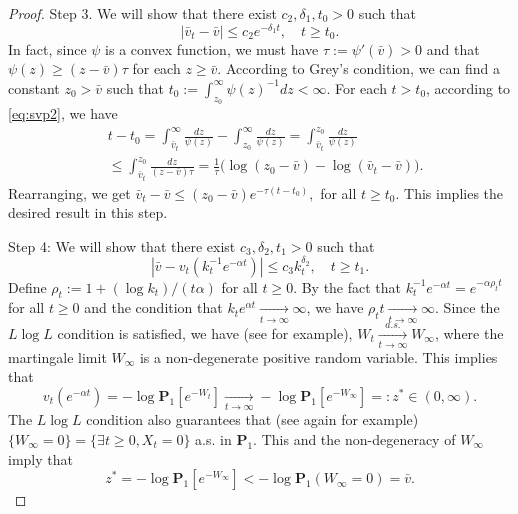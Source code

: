 \documentclass[12pt,a4paper]{amsart}
\theoremstyle{plain}
\theoremstyle{definition}
\numberwithin{equation}{section}
\begin{document}
\begin{proof}
    Step 3. We will show that there exist
    $c_2, \delta_1, t_0 > 0$ such that
\[
    |\bar v_t-\bar v|
    \leq c_2e^{-\delta_1 t},    \quad t\geq t_0.
\]
        In fact, since $\psi$ is a convex function, we must have $\tau:=\psi'(\bar v)>0$ and that  $\psi(z) \geq (z-\bar v)\tau$ for each $z\geq \bar v$.
    According to Grey's condition, we can find a constant $z_0 >\bar v $ such that
$t_0 := \int^\infty_{z_0}\psi(z)^{-1}dz<\infty$.
For each $t > t_0$, according to \eqref{eq:svp2}, we have
\begin{align}
    &t-t_0 =
    \int^\infty_{\bar v_t} \frac{dz}{\psi(z)} - \int_{z_0}^\infty \frac{dz}{\psi(z)}
    =\int_{\bar v_t}^{z_0} \frac{dz}{\psi(z)}
    \\ &\leq \int_{\bar v_t}^{z_0} \frac{dz}{(z-\bar v)\tau}
    = \frac{1}{\tau} \big(\log (z_0-\bar v) - \log(\bar v_t-\bar v)\big).
\end{align}
    Rearranging, we get
$
    \bar v_t - \bar v \leq (z_0 - \bar v)e^{-\tau(t-t_0)},
$ for all $t\geq t_0$.
    This implies the desired result in this step.

    Step 4: We will show that there exist $c_3, \delta_2, t_1>0$ such that
\[
    |\bar v - v_t(k_t^{-1} e^{-\alpha t})|\leq
    c_3k_t^{\delta_2}, \quad t\geq t_1.
\]
    Define
$\rho_t := 1+(\log k_t)/(t\alpha)$ for all $t\geq 0$.
By the fact that $k_t^{-1}e^{-\alpha t} = e^{-\alpha \rho_t t}$ for  all $t\geq 0$
    and the condition that $k_t e^{\alpha t} \xrightarrow[t\to \infty]{} \infty$,
    we have $\rho_t t \xrightarrow[t\to \infty]{} \infty $.
    Since the $L\log L$ condition is satisfied, we have (see \cite{LiuRenSong2009Llog} for
 example), $W_t \xrightarrow[t\to \infty]{a.s.} W_\infty$, where the martingale limit $W_\infty$ is a non-degenerate positive random variable. This implies that
\[
    v_t(e^{-\alpha t}) = -\log \mathbf P_1[e^{-W_t}]\xrightarrow[t\to \infty]{} - \log \mathbf P_{1}[e^{-W_\infty}] =: z^* \in (0,\infty).
\]
    The $L \log L$ condition also guarantees that (see again \cite{LiuRenSong2009Llog}
    for example) $\{W_\infty = 0\} = \{\exists t \geq 0, X_t= 0\}$  a.s. in $\mathbf P_1$. This and the non-degeneracy of $W_\infty$ imply that
\[
    z^*=-\log \mathbf P_1[e^{-W_\infty}] < -\log \mathbf P_1(W_\infty = 0) = \bar v.
\]


\end{proof}
\end{document}
